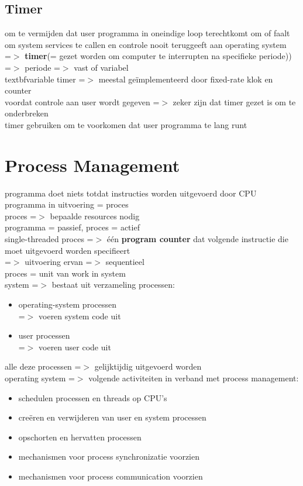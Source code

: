 \documentclass{report}
\begin{document}
\subsection{Timer}
om te vermijden dat user programma in oneindige loop terechtkomt om of faalt om system services te callen en controle nooit teruggeeft aan operating system
\\=$>$ \textbf{timer}(= gezet worden om computer te interrupten na specifieke periode))
\\=$>$ periode =$>$ vast of variabel
\\textbf{variable timer} =$>$ meestal ge\"implementeerd door fixed-rate klok en counter
\\voordat controle aan user wordt gegeven =$>$ zeker zijn dat timer gezet is om te onderbreken
\\timer gebruiken om te voorkomen dat user programma te lang runt

\section{Process Management}
programma doet niets totdat instructies worden uitgevoerd door CPU
\\programma in uitvoering = proces
\\proces =$>$ bepaalde resources nodig
\\programma = passief, proces = actief
\\single-threaded proces =$>$ \'e\'en \textbf{program counter} dat volgende instructie die moet uitgevoerd worden specifieert
\\=$>$ uitvoering ervan =$>$ sequentieel 
\\proces = unit van work in system
\\system =$>$ bestaat uit verzameling processen:
\begin{itemize}
\item operating-system processen
\\=$>$ voeren system code uit
\item user processen
\\=$>$ voeren user code uit
\end{itemize}
alle deze processen =$>$ gelijktijdig uitgevoerd worden
\\operating system =$>$ volgende activiteiten in verband met process management:
\begin{itemize}
\item schedulen processen en threads op CPU's
\item creëren en verwijderen van user en system processen
\item opschorten en hervatten processen
\item mechanismen voor process synchronizatie voorzien
\item mechanismen voor process communication voorzien
\end{itemize}
\end{document}
